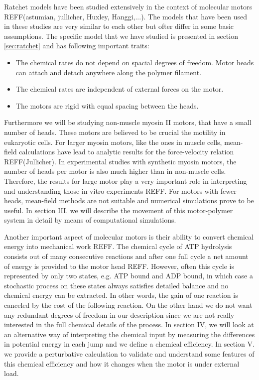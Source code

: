 \documentclass[aps,pre,twocolumn,showpacs,showkeys,a4paper]{revtex4}
\begin{document}
Ratchet models have been studied extensively in the context of molecular motors REFF(astumian, jullicher, Huxley, Hanggi,...). %
The models that have been used in these studies are very similar to each other but ofter differ in some basic assumptions.
The specific model that we have studied is presented in section \ref{sec:ratchet} and has following important traits:
\begin{itemize}
\item The chemical rates do not depend on spacial degrees of freedom. 
Motor heads can attach and detach anywhere along the polymer filament.
\item The chemical rates are independent of external forces on the motor.
\item The motors are rigid with equal spacing between the heads.
\end{itemize} 
Furthermore we will be studying non-muscle myosin II motors, that have a small number of heads. 
These motors are believed to be crucial the motility in eukaryotic cells.
For larger myosin motors, like the ones in muscle cells, mean-field calculations have lead to analytic results for the force-velocity relation REFF(Jullicher). %
In experimental studies with synthetic myosin motors, the number of heads per motor is also much higher than in non-muscle cells. 
Therefore, the results for large motor play a very important role in interpreting and understanding those in-vitro experiments REFF. %
For motors with fewer heads, mean-field methods are not suitable and numerical simulations prove to be useful.
In section III. we will describe the movement of this motor-polymer system in detail by means of computational simulations. %


Another important aspect of molecular motors is their ability to convert chemical energy into mechanical work REFF. %
The chemical cycle of ATP hydrolysis consists out of many consecutive reactions and after one full cycle a net amount of energy is provided to the motor head REFF. %
However, often this cycle is represented by only two states, e.g. ATP bound and ADP bound, 
in which case a stochastic process on these states always satisfies detailed balance and no chemical energy can be extracted. 
In other words, the gain of one reaction is canceled by the cost of the following reaction.
On the other hand we do not want any redundant degrees of freedom in our description since we are not really interested in the full chemical details of the process.
In section IV, we will look at an alternative way of interpreting the chemical input by measuring the differences in potential energy in each jump and we define a chemical efficiency. %
In section V. we provide a perturbative calculation to validate and understand some features of this chemical efficiency and how it changes when the motor is under external load. %
\end{document}
